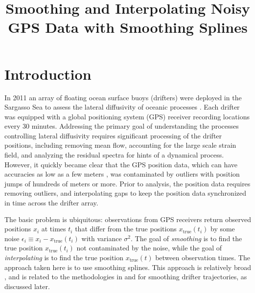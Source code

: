 \documentclass{ametsoc}
\title{Smoothing and Interpolating Noisy GPS Data with Smoothing Splines}
\affiliation{}
\begin{document}
\maketitle



%
\section{Introduction}
%
In 2011 an array of floating ocean surface buoys (drifters) were deployed in the Sargasso Sea to assess the lateral diffusivity of oceanic processes \citep{shcherbina2015-bams}. Each drifter was equipped with a global positioning system (GPS) receiver recording locations every 30 minutes. Addressing the primary goal of understanding the processes controlling lateral diffusivity requires significant processing of the drifter positions, including removing mean flow, accounting for the large scale strain field, and analyzing the residual spectra for hints of a dynamical process. However, it quickly became clear that the GPS position data, which can have accuracies as low as a few meters \citep{faa2016-report}, was contaminated by outliers with position jumps of hundreds of meters or more. Prior to analysis, the position data requires removing outliers, and interpolating gaps to keep the position data synchronized in time across the drifter array.

The basic problem is ubiquitous: observations from GPS receivers return observed positions $x_i$ at times $t_i$ that differ from the true positions $x_{\textrm{true}}(t_i)$ by some noise $\epsilon_i \equiv x_i - x_{\textrm{true}}(t_i)$ with variance $\sigma^2$. The goal of \emph{smoothing} is to find the true position $x_{\textrm{true}}(t_i)$ not contaminated by the noise, while the goal of \emph{interpolating} is to find the true position $x_{\textrm{true}}(t)$ between observation times. The approach taken here is to use smoothing splines. This approach is relatively broad \citep{handcock1994-jasa,nychka2000-book}, and is related to the methodologies in \citet{yaremchuk2015-joe} and \citet{elipot2016-jgr} for smoothing drifter trajectories, as discussed later. 
\end{document}
